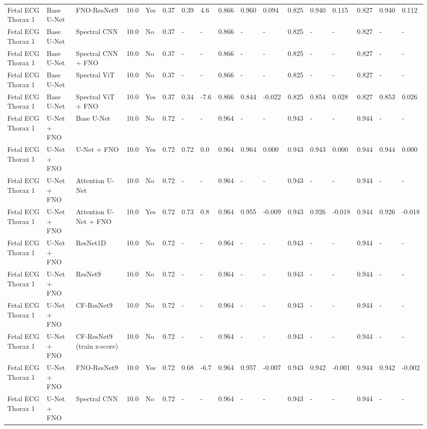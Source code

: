 \begin{longtable}{lllllllllllllllll}
Fetal ECG Thorax 1 & Base U-Net & FNO-ResNet9 & 10.0 & Yes & 0.37 & 0.39 & 4.6 & 0.866 & 0.960 & 0.094 & 0.825 & 0.940 & 0.115 & 0.827 & 0.940 & 0.112 \\
Fetal ECG Thorax 1 & Base U-Net & Spectral CNN & 10.0 & No & 0.37 & - & - & 0.866 & - & - & 0.825 & - & - & 0.827 & - & - \\
Fetal ECG Thorax 1 & Base U-Net & Spectral CNN + FNO & 10.0 & No & 0.37 & - & - & 0.866 & - & - & 0.825 & - & - & 0.827 & - & - \\
Fetal ECG Thorax 1 & Base U-Net & Spectral ViT & 10.0 & No & 0.37 & - & - & 0.866 & - & - & 0.825 & - & - & 0.827 & - & - \\
Fetal ECG Thorax 1 & Base U-Net & Spectral ViT + FNO & 10.0 & Yes & 0.37 & 0.34 & -7.6 & 0.866 & 0.844 & -0.022 & 0.825 & 0.854 & 0.028 & 0.827 & 0.853 & 0.026 \\
Fetal ECG Thorax 1 & U-Net + FNO & Base U-Net & 10.0 & No & 0.72 & - & - & 0.964 & - & - & 0.943 & - & - & 0.944 & - & - \\
Fetal ECG Thorax 1 & U-Net + FNO & U-Net + FNO & 10.0 & Yes & 0.72 & 0.72 & 0.0 & 0.964 & 0.964 & 0.000 & 0.943 & 0.943 & 0.000 & 0.944 & 0.944 & 0.000 \\
Fetal ECG Thorax 1 & U-Net + FNO & Attention U-Net & 10.0 & No & 0.72 & - & - & 0.964 & - & - & 0.943 & - & - & 0.944 & - & - \\
Fetal ECG Thorax 1 & U-Net + FNO & Attention U-Net + FNO & 10.0 & Yes & 0.72 & 0.73 & 0.8 & 0.964 & 0.955 & -0.009 & 0.943 & 0.926 & -0.018 & 0.944 & 0.926 & -0.018 \\
Fetal ECG Thorax 1 & U-Net + FNO & ResNet1D & 10.0 & No & 0.72 & - & - & 0.964 & - & - & 0.943 & - & - & 0.944 & - & - \\
Fetal ECG Thorax 1 & U-Net + FNO & ResNet9 & 10.0 & No & 0.72 & - & - & 0.964 & - & - & 0.943 & - & - & 0.944 & - & - \\
Fetal ECG Thorax 1 & U-Net + FNO & CF-ResNet9 & 10.0 & No & 0.72 & - & - & 0.964 & - & - & 0.943 & - & - & 0.944 & - & - \\
Fetal ECG Thorax 1 & U-Net + FNO & CF-ResNet9 (train z-score) & 10.0 & No & 0.72 & - & - & 0.964 & - & - & 0.943 & - & - & 0.944 & - & - \\
Fetal ECG Thorax 1 & U-Net + FNO & FNO-ResNet9 & 10.0 & Yes & 0.72 & 0.68 & -6.7 & 0.964 & 0.957 & -0.007 & 0.943 & 0.942 & -0.001 & 0.944 & 0.942 & -0.002 \\
Fetal ECG Thorax 1 & U-Net + FNO & Spectral CNN & 10.0 & No & 0.72 & - & - & 0.964 & - & - & 0.943 & - & - & 0.944 & - & - \\

\end{longtable}
